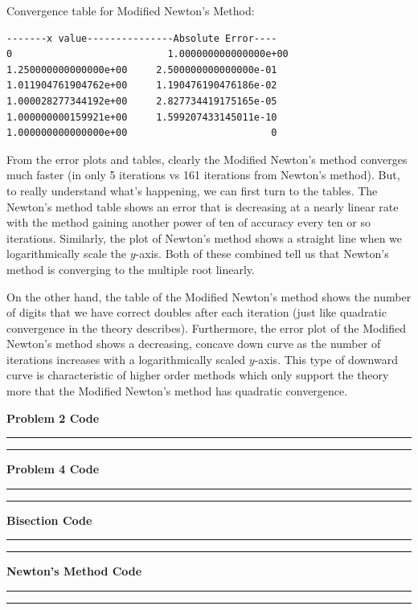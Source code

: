 \documentclass[a4paper,12pt]{article}
\begin{document}
\begin{enumerate}[label = \arabic*.]
\begin{enumerate}[label = \roman*.]
            Convergence table for Modified Newton's Method:
            \begin{verbatim}
-------x value---------------Absolute Error----
0                    	    1.000000000000000e+00
1.250000000000000e+00     2.500000000000000e-01
1.011904761904762e+00     1.190476190476186e-02
1.000028277344192e+00     2.827734419175165e-05
1.000000000159921e+00     1.599207433145011e-10
1.000000000000000e+00                         0
            \end{verbatim}
        
        From the error plots and tables, clearly the Modified Newton's method converges much faster (in only 5 iterations vs 161 iterations from Newton's method). But, to really understand what's happening, we can first turn to the tables. The Newton's method table shows an error that is decreasing at a nearly linear rate with the method gaining another power of ten of accuracy every ten or so iterations. Similarly, the plot of Newton's method shows a straight line when we logarithmically scale the $ y $-axis. Both of these combined tell us that Newton's method is converging to the multiple root linearly. 
        
        On the other hand, the table of the Modified Newton's method shows the number of digits that we have correct doubles after each iteration (just like quadratic convergence in the theory describes). Furthermore, the error plot of the Modified Newton's method shows a decreasing, concave down curve as the number of iterations increases with a logarithmically scaled $ y $-axis. This type of downward curve is characteristic of higher order methods which only support the theory more that the Modified Newton's method has quadratic convergence.
	\end{enumerate}
\end{enumerate}

\newpage
\begin{center}
    \textbf{Problem 2 Code}
\end{center}
\rule{\textwidth}{0.4pt}

\rule{\textwidth}{0.4pt}

\newpage
\begin{center}
    \textbf{Problem 4 Code}
\end{center}
\rule{\textwidth}{0.4pt}

\rule{\textwidth}{0.4pt}

\newpage
\begin{center}
    \textbf{Bisection Code}
\end{center}
\rule{\textwidth}{0.4pt}

\rule{\textwidth}{0.4pt}

\newpage
\begin{center}
    \textbf{Newton's Method Code}
\end{center}
\rule{\textwidth}{0.4pt}

\rule{\textwidth}{0.4pt}
\end{document}

